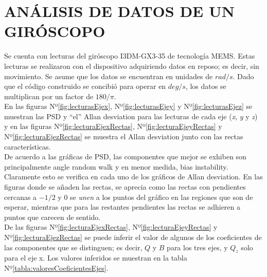 \documentclass[a4paper,11pt,twoside]{IT-CNEA}
\begin{document}
\section{ANÁLISIS DE DATOS DE UN GIRÓSCOPO}
Se cuenta con lecturas del giróscopo I3DM-GX3-35 de tecnología MEMS. Estas lecturas se realizaron con el dispositivo adquiriendo datos en reposo; es decir, sin movimiento. Se asume que los datos se encuentran en unidades de $rad/s$. Dado que el código construido se concibió para operar en $deg/s$, los datos se multiplican por un factor de $180/\pi$.
\\En las figuras Nº\ref{fig:lecturasEjex}, Nº\ref{fig:lecturasEjey} y Nº\ref{fig:lecturasEjez} se muestran las PSD y ``el'' Allan desviation para las lecturas de cada eje (\textit{x}, \textit{y} y \textit{z}) y en las figuras Nº\ref{fig:lecturaEjexRectas}, Nº\ref{fig:lecturaEjeyRectas} y Nº\ref{fig:lecturaEjezRectas} se muestra el Allan desviation junto con las rectas características. 
\\ De acuerdo a las gráficas de PSD, las componentes que mejor se exhiben son principalmente angle random walk y en menor medida, bias instability. Claramente esto se verifica en cada uno de los gráficos de Allan desviation. En las figuras donde se añaden las rectas, se aprecia como las rectas con pendientes cercanas a $-1/2$ y $0$ se \textit{unen} a los puntos del gráfico en las regiones que son de esperar, mientras que para las restantes pendientes las rectas se adhieren a puntos que carecen de sentido. 
\\ De las figuras Nº\ref{fig:lecturaEjexRectas}, Nº\ref{fig:lecturaEjeyRectas} y Nº\ref{fig:lecturaEjezRectas} se puede inferir el valor de algunos de los coeficientes de las componentes que se distinguen; es decir, $Q$ y $B$ para los tres ejes, y $Q_z$ solo para el eje x. Los valores inferidos se muestran en la tabla Nº\ref{tabla:valoresCoeficientesEjes}.
\end{document}
